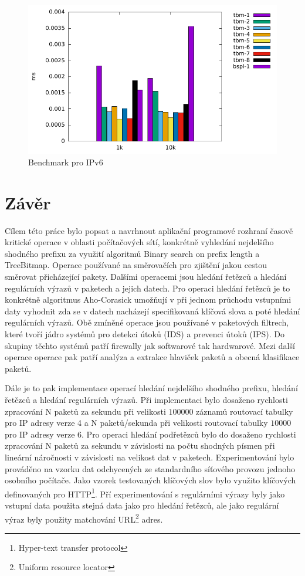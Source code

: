 \begin{figure}[!htb]
	\centering
	\includegraphics[scale=1]{fig/lpm-ipv6.pdf}
	\caption{Benchmark pro IPv6}
\end{figure}\label{fig:lpm-ipv4}

\chapter{Závěr}\label{chapter:conclusion}
Cílem této práce bylo popsat a navrhnout aplikační programové rozhraní časově kritické operace v oblasti počítačových sítí,
konkrétně vyhledání nejdelšího shodného prefixu za využití algoritmů Binary search on prefix length
a TreeBitmap. Operace používané na směrovačích pro zjištění jakou cestou směrovat přicházející pakety.
Dalšími operacemi jsou hledání řetězců a hledání regulárních výrazů v paketech a jejich datech.
Pro operaci hledání řetězců je to konkrétně algoritmus Aho-Corasick \cite{aho} umožňují v
při jednom průchodu vstupními daty vyhodnit zda se v datech nacházejí specifikovaná klíčová slova
a poté hledání regulárních výrazů. Obě zmíněné operace jsou používané v paketových filtrech,
které tvoří jádro systémů pro detekci útoků (IDS) a prevenci útoků (IPS). Do skupiny těchto
systémů patří firewally jak softwarové tak hardwarové. Mezi další operace operace pak patří
analýza a extrakce hlaviček paketů a obecná klasifikace paketů.

Dále je to pak implementace operací hledání nejdelšího shodného prefixu, hledání řetězců
a hledání regulárních výrazů. Při implementaci bylo dosaženo rychlosti zpracování N paketů za sekundu
při velikosti $100000$ záznamů routovací tabulky pro IP adresy verze 4 a N paketů/sekunda při velikosti
routovací tabulky $10000$ pro IP adresy verze 6. Pro operaci hledání podřetězců bylo
do dosaženo rychlosti zpracování N paketů za sekundu v závislosti na počtu shodných písmen
při lineární náročnosti v závislosti na velikost dat v paketech. Experimentování bylo prováděno
na vzorku dat odchycených ze standardního síťového provozu jednoho osobního počítače. Jako vzorek
testovaných klíčových slov bylo využito klíčových definovaných pro HTTP\footnote{Hyper-text transfer protocol}.
Pří experimentování s regulárními výrazy byly jako vstupní data použita stejná data jako pro hledání řetězců,
ale jako regulární výraz byly použity matchování URL\footnote{Uniform resource locator} adres.

